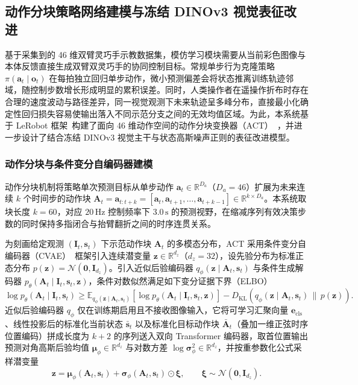 \subsection{动作分块策略网络建模与冻结 DINOv3 视觉表征改进}
\label{subsec:act}

基于采集到的 46 维双臂灵巧手示教数据集，模仿学习模块需要从当前彩色图像与本体反馈直接生成双臂双灵巧手的协同控制目标。常规单步行为克隆策略 $\pi(\bm{a}_t \mid \bm{o}_t)$ 在每拍独立回归单步动作，微小预测偏差会将状态推离训练轨迹邻域，随控制步数增长形成明显的累积误差。同时，人类操作者在遥操作折布时存在合理的速度波动与路径差异，同一视觉观测下未来轨迹呈多峰分布，直接最小化确定性回归损失容易使输出落入不同示范分支之间的无效均值区域。为此，本系统基于 LeRobot 框架~\cite{cadene2026lerobot}构建了面向 46 维动作空间的动作分块变换器（ACT）~\cite{zhao2023learning}，并进一步设计了结合冻结 DINOv3 视觉主干与状态高斯噪声正则的表征改进模型。

\subsubsection{动作分块与条件变分自编码器建模}

动作分块机制将策略单次预测目标从单步动作 $\bm{a}_t \in \mathbb{R}^{D_a}$（$D_a = 46$）扩展为未来连续 $k$ 个时间步的动作块 $\bm{A}_t = \bm{a}_{t:t+k} = [\bm{a}_t, \bm{a}_{t+1}, \dots, \bm{a}_{t+k-1}] \in \mathbb{R}^{k\times D_a}$。本系统取块长度 $k = 60$，对应 $20\,\mathrm{Hz}$ 控制频率下 $3.0\,\mathrm{s}$ 的预测视野，在缩减序列有效决策步数的同时保持多指闭合与抬臂翻折之间的时序连贯关系。

为刻画给定观测 $(\bm{I}_t, \bm{s}_t)$ 下示范动作块 $\bm{A}_t$ 的多模态分布，ACT 采用条件变分自编码器（CVAE）~\cite{kingma2014auto}框架引入连续潜变量 $\bm{z} \in \mathbb{R}^{d_z}$（$d_z = 32$），设先验分布为标准正态分布 $p(\bm{z}) = \mathcal{N}(\bm{0}, \bm{I}_{d_z})$。引入近似后验编码器 $q_{\phi}(\bm{z} \mid \bm{A}_t, \bm{s}_t)$ 与条件生成解码器 $p_{\theta}(\bm{A}_t \mid \bm{I}_t, \bm{s}_t, \bm{z})$，条件对数似然满足如下变分证据下界（ELBO）
\begin{equation}
  \log p_{\theta}(\bm{A}_t \mid \bm{I}_t, \bm{s}_t) \ge \mathbb{E}_{q_{\phi}(\bm{z} \mid \bm{A}_t, \bm{s}_t)}\!\left[\log p_{\theta}(\bm{A}_t \mid \bm{I}_t, \bm{s}_t, \bm{z})\right] - D_{\mathrm{KL}}\!\left(q_{\phi}(\bm{z} \mid \bm{A}_t, \bm{s}_t) \,\|\, p(\bm{z})\right).
  \label{eq:cvae-elbo}
\end{equation}
近似后验编码器 $q_{\phi}$ 仅在训练期启用且不接收图像输入，它将可学习汇聚向量 $\bm{e}_{\text{cls}}$、线性投影后的标准化当前状态 $\bar{\bm{s}}_t$ 以及标准化目标动作块 $\bar{\bm{A}}_t$（叠加一维正弦时序位置编码）拼成长度为 $k + 2$ 的序列送入双向 Transformer 编码器，取首位置输出预测对角高斯后验均值 $\bm{\mu}_{\phi} \in \mathbb{R}^{d_z}$ 与对数方差 $\log\bm{\sigma}_{\phi}^2 \in \mathbb{R}^{d_z}$，并按重参数化公式采样潜变量
\begin{equation}
  \bm{z} = \bm{\mu}_{\phi}(\bm{A}_t, \bm{s}_t) + \bm{\sigma}_{\phi}(\bm{A}_t, \bm{s}_t) \odot \bm{\xi}, \qquad \bm{\xi} \sim \mathcal{N}(\bm{0}, \bm{I}_{d_z}).
  \label{eq:cvae-reparam}
\end{equation}

